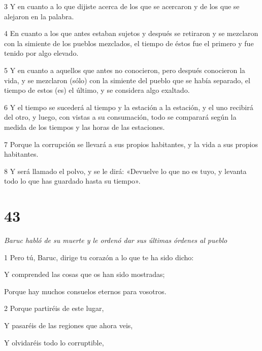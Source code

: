 \par 3 Y en cuanto a lo que dijiste acerca de los que se acercaron y de los que se alejaron en la palabra.

\par 4 En cuanto a los que antes estaban sujetos y después se retiraron y se mezclaron con la simiente de los pueblos mezclados, el tiempo de éstos fue el primero y fue tenido por algo elevado.

\par 5 Y en cuanto a aquellos que antes no conocieron, pero después conocieron la vida, y se mezclaron (sólo) con la simiente del pueblo que se había separado, el tiempo de estos (es) el último, y se considera algo exaltado.

\par 6 Y el tiempo se sucederá al tiempo y la estación a la estación, y el uno recibirá del otro, y luego, con vistas a su consumación, todo se comparará según la medida de los tiempos y las horas de las estaciones.

\par 7 Porque la corrupción se llevará a sus propios habitantes, y la vida a sus propios habitantes.

\par 8 Y será llamado el polvo, y se le dirá: «Devuelve lo que no es tuyo, y levanta todo lo que has guardado hasta su tiempo».


\chapter{43}

\par \textit{Baruc habló de su muerte y le ordenó dar sus últimas órdenes al pueblo}

\par 1 Pero tú, Baruc, dirige tu corazón a lo que te ha sido dicho:

\par Y comprended las cosas que os han sido mostradas;

\par Porque hay muchos consuelos eternos para vosotros.

\par 2 Porque partiréis de este lugar,

\par Y pasaréis de las regiones que ahora veis,

\par Y olvidaréis todo lo corruptible,

